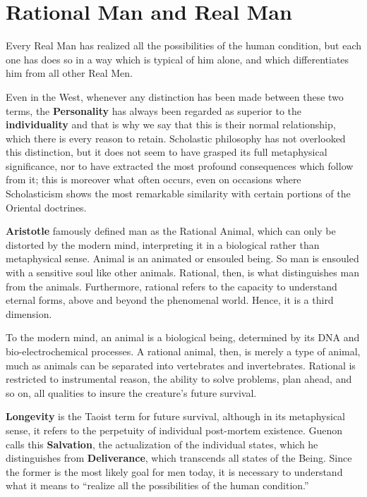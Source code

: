 \section{Rational Man and Real Man}

\begin{quotex}
Every Real Man has realized all the possibilities of the human condition, but each one has does so in a way which is typical of him alone, and which differentiates him from all other Real Men. 

Even in the West, whenever any distinction has been made between these two terms, the \textbf{Personality} has always been regarded as superior to the \textbf{individuality} and that is why we say that this is their normal relationship, which there is every reason to retain. Scholastic philosophy has not overlooked this distinction, but it does not seem to have grasped its full metaphysical significance, nor to have extracted the most profound consequences which follow from it; this is moreover what often occurs, even on occasions where Scholasticism shows the most remarkable similarity with certain portions of the Oriental doctrines. 

\end{quotex}
\textbf{Aristotle} famously defined man as the Rational Animal, which can only be distorted by the modern mind, interpreting it in a biological rather than metaphysical sense. Animal is an animated or ensouled being. So man is ensouled with a sensitive soul like other animals. Rational, then, is what distinguishes man from the animals. Furthermore, rational refers to the capacity to understand eternal forms, above and beyond the phenomenal world. Hence, it is a third dimension.

To the modern mind, an animal is a biological being, determined by its DNA and bio-electrochemical processes. A rational animal, then, is merely a type of animal, much as animals can be separated into vertebrates and invertebrates. Rational is restricted to instrumental reason, the ability to solve problems, plan ahead, and so on, all qualities to insure the creature's future survival.

\textbf{Longevity} is the Taoist term for future survival, although in its metaphysical sense, it refers to the perpetuity of individual post-mortem existence. Guenon calls this \textbf{Salvation}, the actualization of the individual states, which he distinguishes from \textbf{Deliverance}, which transcends all states of the Being. Since the former is the most likely goal for men today, it is necessary to understand what it means to “realize all the possibilities of the human condition.”

